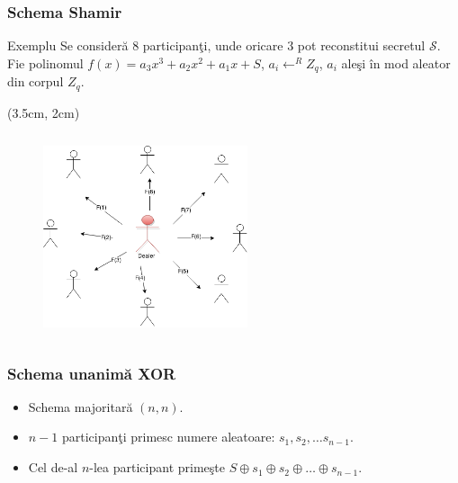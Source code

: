 \documentclass{beamer}
\begin{document}
\begin{frame}
    \frametitle{Schema Shamir}
     {
        \begin{exampleblock}{Exemplu}
           Se consider\u{a} 8 participan\c{t}i, unde oricare $3$ pot reconstitui secretul $\mathcal{S}$.
           Fie polinomul $f(x) = a_3x ^ 3 + a_2x ^ 2 + a_1x + S$, $a_i \leftarrow^R Z_q$, $a_i$ ale\c{s}i \^{i}n mod aleator din corpul $Z_q$.
        \end{exampleblock}
    }
     {
     \begin{textblock*}{4cm}(3.5cm, 2cm)
        \begin{figure}
            \includegraphics[width=6cm,height=6cm,keepaspectratio]{img/shamir/example.png}
       \end{figure}
        \end{textblock*}
 
    }
\end{frame}

\begin{frame}
    \frametitle{Schema unanim\u{a} XOR}
    \begin{itemize}
        \item Schema majoritar\u{a} $(n,n)$.
        \pause
        \item $n-1$ participan\c{t}i primesc numere aleatoare: $s_1, s_2, \dots s_{n-1}$.
        \pause
        \item Cel de-al $n$-lea participant prime\c{s}te $S \oplus s_1 \oplus s_2 \oplus \dots \oplus s_{n-1}$.
    \end{itemize}
\end{frame}
\end{document}
